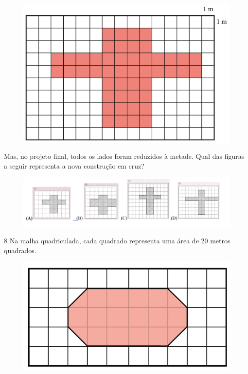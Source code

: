 \begin{figure}[htpb!]
\centering
\includegraphics[width=\textwidth]{../ilustracoes/MAT5/SAEB_5ANO_MAT_figura41.png}
\end{figure}

Mas, no projeto final, todos os lados foram reduzidos à metade. Qual das
figuras a seguir representa a nova construção em cruz?

\begin{figure}[htpb!]
\includegraphics[width=\textwidth]{./imgs/mat6.png}
\end{figure}


\pagebreak
\num{8} Na malha quadriculada, cada quadrado representa uma área de
20 metros quadrados.

\begin{figure}[htpb!]
\centering
\includegraphics[width=.8\textwidth]{../ilustracoes/MAT5/SAEB_5ANO_MAT_figura43.png}
\end{figure}

